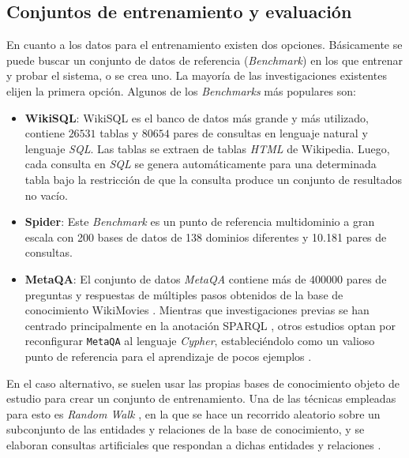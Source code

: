 \subsection{Conjuntos de entrenamiento y evaluación} \label{neurosymbolic_approach_bechmarks}

En cuanto a los datos para el entrenamiento existen dos opciones. Básicamente se puede buscar un conjunto de datos de referencia (\textit{Benchmark}) en los que entrenar y probar el sistema, o se crea uno. La mayoría de las investigaciones existentes elijen la primera opción. Algunos de los \textit{Benchmarks} más populares son:

\begin{itemize}
	\item \textbf{WikiSQL}: WikiSQL \cite{zhongetal2017} es el banco de datos más grande y más utilizado, contiene $26531$ tablas y $80654$ pares de consultas en lenguaje natural y lenguaje \textit{SQL}. Las tablas se extraen de tablas \textit{HTML} de Wikipedia. Luego, cada consulta en \textit{SQL} se genera automáticamente para una determinada tabla bajo la restricción de que la consulta produce un conjunto de resultados no vacío.

	\item \textbf{Spider}: Este \textit{Benchmark} \cite{spiderdataset} es un punto de referencia multidominio a gran escala con 200 bases de datos de 138 dominios diferentes y 10.181 pares de consultas.

	\item \textbf{MetaQA}: El conjunto de datos \textit{MetaQA} \cite{metaqa} contiene más de $400000$ pares de preguntas y respuestas de múltiples pasos obtenidos de la base de conocimiento WikiMovies \cite{milleretal2016}. Mientras que investigaciones previas se han centrado principalmente en la anotación SPARQL \cite{huangetal2021}, otros estudios optan por reconfigurar \texttt{MetaQA} al lenguaje \textit{Cypher}, estableciéndolo como un valioso punto de referencia para el aprendizaje de pocos ejemplos \cite{Nie2022GraphQ}.

\end{itemize}

En el caso alternativo, se suelen usar las propias bases de conocimiento objeto de estudio para crear un conjunto de entrenamiento. Una de las técnicas empleadas para esto es \textit{Random Walk} \cite{randomwalk}, en la que se hace un recorrido aleatorio sobre un subconjunto de las entidades y relaciones de la base de conocimiento, y se elaboran consultas artificiales que respondan a dichas entidades y relaciones \cite{adrianbazaga2021}.

